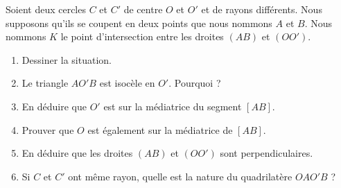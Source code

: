 
\begin{exercice}\label{exoSeconde-0100}

    Soient deux cercles \( C\) et \( C'\) de centre \( O\) et \( O'\) et de rayons différents. Nous supposons qu'ils se coupent en deux points que nous nommons \( A\) et \( B\). Nous nommons \( K\) le point d'intersection entre les droites \( (AB)\) et \( (OO')\).
    \begin{multicols}{2}
        \begin{enumerate}
        \item
            Dessiner la situation.
        \item
            Le triangle \( AO'B\) est isocèle en \( O'\). Pourquoi ?
        \item
            En déduire que \( O'\) est sur la médiatrice du segment \( [AB]\).
        \item
            Prouver que \( O\) est également sur la médiatrice de \( [AB]\).
        \item
            En déduire que les droites \( (AB)\) et \( (OO')\) sont perpendiculaires.
        \item
            Si \( C\) et \( C'\) ont même rayon, quelle est la nature du quadrilatère \( OAO'B\) ?
    \end{enumerate}
    \end{multicols}

\end{exercice}
